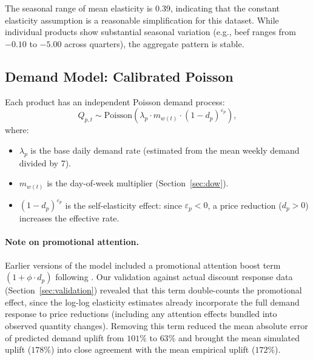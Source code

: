 \documentclass[11pt,a4paper]{article}
\begin{document}
The seasonal range of mean elasticity is 0.39, indicating that the constant elasticity assumption is a reasonable simplification for this dataset.
While individual products show substantial seasonal variation (e.g., beef ranges from $-0.10$ to $-5.00$ across quarters), the aggregate pattern is stable.

\subsection{Demand Model: Calibrated Poisson}
\label{sec:poisson}

Each product has an independent Poisson demand process:
\begin{equation}
Q_{p,t} \sim \text{Poisson}\!\left(\lambda_p \cdot m_{w(t)} \cdot (1 - d_p)^{\varepsilon_p}\right),
\end{equation}
where:
\begin{itemize}
    \item $\lambda_p$ is the base daily demand rate (estimated from the mean weekly demand divided by 7).
    \item $m_{w(t)}$ is the day-of-week multiplier (Section~\ref{sec:dow}).
    \item $(1 - d_p)^{\varepsilon_p}$ is the self-elasticity effect: since $\varepsilon_p < 0$, a price reduction ($d_p > 0$) increases the effective rate.
\end{itemize}

\paragraph{Note on promotional attention.}
Earlier versions of the model included a promotional attention boost term $(1 + \phi \cdot d_p)$ following \citet{blattberg1990}.
Our validation against actual discount response data (Section~\ref{sec:validation}) revealed that this term double-counts the promotional effect, since the log-log elasticity estimates already incorporate the full demand response to price reductions (including any attention effects bundled into observed quantity changes).
Removing this term reduced the mean absolute error of predicted demand uplift from $101\%$ to $63\%$ and brought the mean simulated uplift ($178\%$) into close agreement with the mean empirical uplift ($172\%$).
\end{document}
